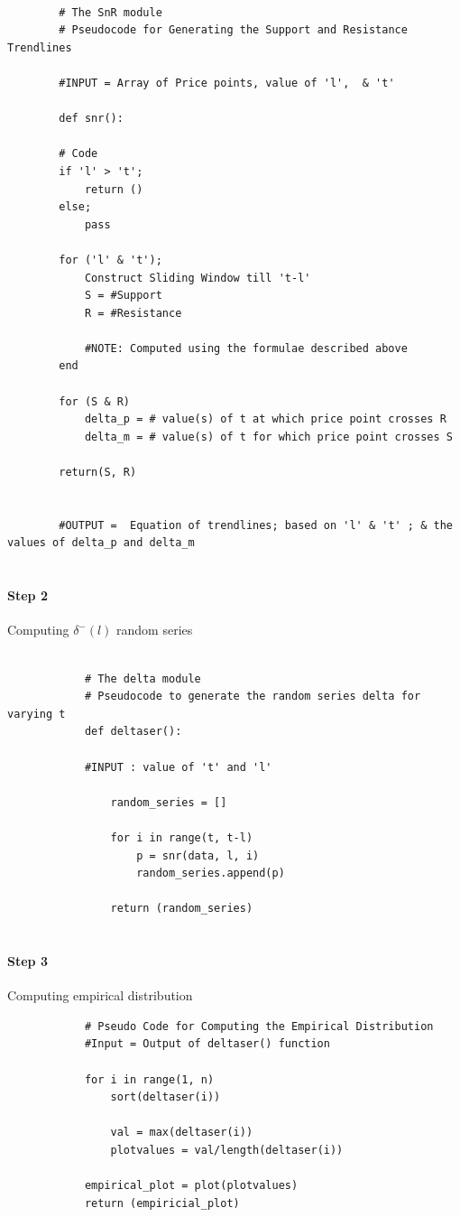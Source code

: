 \documentclass[letterpaper, 12pt] {article}
\begin{document}
		\begin{lstlisting}
		
		# The SnR module
		# Pseudocode for Generating the Support and Resistance Trendlines
		
		#INPUT = Array of Price points, value of 'l',  & 't'
		
		def snr():
		
		# Code
		if 'l' > 't'; 
			return ()
		else;
			pass
		
		for ('l' & 't'); 
			Construct Sliding Window till 't-l'
			S = #Support
			R = #Resistance 
			
			#NOTE: Computed using the formulae described above
		end
		
		for (S & R)
			delta_p = # value(s) of t at which price point crosses R
			delta_m = # value(s) of t for which price point crosses S
		
		return(S, R)
		
		
		#OUTPUT =  Equation of trendlines; based on 'l' & 't' ; & the values of delta_p and delta_m
		
		\end{lstlisting}
	
	\paragraph{Step 2} Computing $\delta^-(l)$ random series
	
		\begin{lstlisting}
			
			# The delta module
			# Pseudocode to generate the random series delta for varying t
			def deltaser():
			
			#INPUT : value of 't' and 'l'
			
				random_series = []
				
				for i in range(t, t-l)
					p = snr(data, l, i)
					random_series.append(p)
					
				return (random_series)
		
		\end{lstlisting}
		
	\paragraph{Step 3} Computing empirical distribution
	
		\begin{lstlisting}
			# Pseudo Code for Computing the Empirical Distribution
			#Input = Output of deltaser() function
			
			for i in range(1, n)
				sort(deltaser(i))
				
				val = max(deltaser(i))
				plotvalues = val/length(deltaser(i))
			
			empirical_plot = plot(plotvalues)	
			return (empiricial_plot)
			
			
				
		\end{lstlisting}
		
\end{document}
